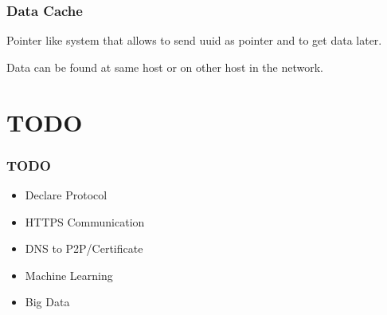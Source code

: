 \begin{frame}
	\frametitle{Data Cache}
		Pointer like system that allows to send uuid as pointer and to get data later.
		
		Data can be found at same host or on other host in the network.
\end{frame}

\section{TODO}
\begin{frame}
	\frametitle{TODO}
	\begin{itemize}
		\item Declare Protocol
		\item HTTPS Communication
		\item DNS to P2P/Certificate
		\item Machine Learning
		\item Big Data
	\end{itemize}
\end{frame}



